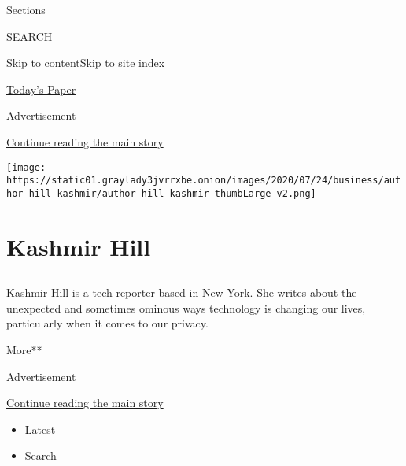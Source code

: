 Sections

SEARCH

\protect\hyperlink{site-content}{Skip to
content}\protect\hyperlink{site-index}{Skip to site index}

\href{https://myaccount.nytimes3xbfgragh.onion/auth/login?response_type=cookie\&client_id=vi}{}

\href{https://www.nytimes3xbfgragh.onion/section/todayspaper}{Today's
Paper}

Advertisement

\protect\hyperlink{after-top}{Continue reading the main story}

\texttt{[image: https://static01.graylady3jvrrxbe.onion/images/2020/07/24/business/author-hill-kashmir/author-hill-kashmir-thumbLarge-v2.png]}

\hypertarget{kashmir-hill}{%
\section{Kashmir Hill}\label{kashmir-hill}}

\hypertarget{section}{%
\subsection{}\label{section}}

Kashmir Hill is a tech reporter based in New York. She writes about the
unexpected and sometimes ominous ways technology is changing our lives,
particularly when it comes to our privacy.

More**

Advertisement

\protect\hyperlink{after-mid1}{Continue reading the main story}

\begin{itemize}
\tightlist
\item
  \protect\hyperlink{stream-panel}{Latest}
\item
  Search
\end{itemize}

